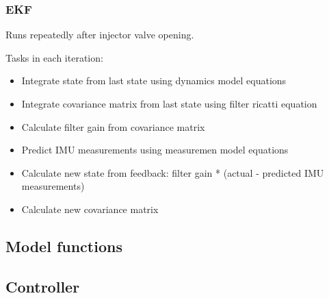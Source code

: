 \subsubsection{EKF}
Runs repeatedly after injector valve opening.

Tasks in each iteration:
\begin{itemize}
    \item Integrate state from last state using dynamics model equations
    \item Integrate covariance matrix from last state using filter ricatti equation 
    \item Calculate filter gain from covariance matrix
    \item Predict IMU measurements using measuremen model equations
    \item Calculate new state from feedback: filter gain * (actual - predicted IMU measurements)
    \item Calculate new covariance matrix
\end{itemize}

\subsection{Model functions}

\subsection{Controller}